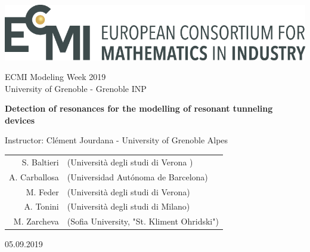 \documentclass[12pt,a4paper,onecolumn]{article}
\theoremstyle{definition}
\theoremstyle{plain}
\begin{document}
\includegraphics[scale=0.4]{ecmi-logo}

ECMI Modeling Week 2019\\
University of Grenoble - Grenoble INP

\begin{center}
\vspace{2.0cm}
{\Large{\textbf{Detection of resonances for the modelling of resonant tunneling devices}}}


Instructor: Clément Jourdana - University of Grenoble Alpes

\begin{tabular}{rl}
S. Baltieri & (Università degli studi di Verona ) \\
A. Carballosa & (Universidad Autónoma de Barcelona) \\
M. Feder & (Università degli studi di Verona) \\
A. Tonini & (Università degli studi di Milano) \\
M. Zarcheva & (Sofia University, "St. Kliment Ohridski")
\end{tabular}


05.09.2019
\end{center}





\newpage

\tableofcontents

\newpage
\end{document}
